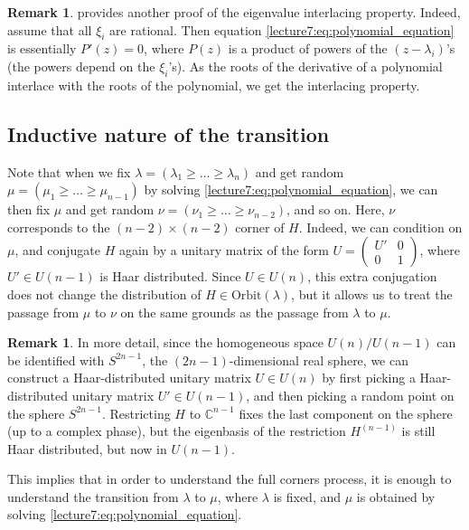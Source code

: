 \documentclass[letterpaper,11pt,oneside,reqno]{book}
\numberwithin{equation}{chapter}  %
\theoremstyle{definition}
\newtheorem{remark}[proposition]{Remark}
\begin{document}
\begin{remark}
	provides another proof of the eigenvalue interlacing property.
	Indeed, assume that all $\xi_i$ are rational. Then
	equation
	\eqref{lecture7:eq:polynomial_equation} is essentially $P'(z)=0$,
	where $P(z)$ is a product of powers of the $(z-\lambda_i)$'s
	(the powers depend on the $\xi_i$'s).
	As the roots of the derivative of a polynomial interlace with the roots of the polynomial,
	we get the interlacing property.
\end{remark}

\subsection{Inductive nature of the transition}

Note that when we fix $\lambda=(\lambda_1\ge \ldots \ge \lambda_n )$
and get random $\mu=(\mu_1\ge \ldots \ge \mu_{n-1} )$ by solving 
\eqref{lecture7:eq:polynomial_equation}, we can then fix $\mu$ and get random
$\nu=(\nu_1\ge \ldots \ge \nu_{n-2} )$, and so on. 
Here, $\nu$ corresponds to the $(n-2)\times(n-2)$ corner of $H$.
Indeed, we can condition on $\mu$, and conjugate $H$ again by a
unitary matrix of the form $U=\begin{pmatrix}
	U'&0\\0&1
\end{pmatrix}$, where $U'\in U(n-1)$ is Haar distributed.
Since $U\in U(n)$, this extra conjugation does not change the distribution of $H\in \mathrm{Orbit}(\lambda)$,
but it allows us to treat the passage from $\mu$ to $\nu$ on the same grounds as the 
passage from $\lambda$ to $\mu$.

\begin{remark}
	In more detail, since the homogeneous space $U(n)/U(n-1)$ 
	can be identified with $S^{2n-1}$, the $(2n-1)$-dimensional real sphere,
	we can construct a Haar-distributed unitary matrix $U\in U(n)$
	by first picking a Haar-distributed unitary matrix $U'\in U(n-1)$,
	and then picking a random point on the sphere $S^{2n-1}$.
	Restricting $H$ to $\mathbb{C}^{n-1}$ fixes the last component on the sphere 
	(up to a complex phase), but the eigenbasis of the restriction $H^{(n-1)}$
	is still Haar distributed, but now in $U(n-1)$.
\end{remark}

This implies that in order to understand the full corners process, it is enough to understand the transition from $\lambda$ to $\mu$,
where $\lambda$ is fixed, and $\mu$ is obtained by solving \eqref{lecture7:eq:polynomial_equation}.
\end{document}
